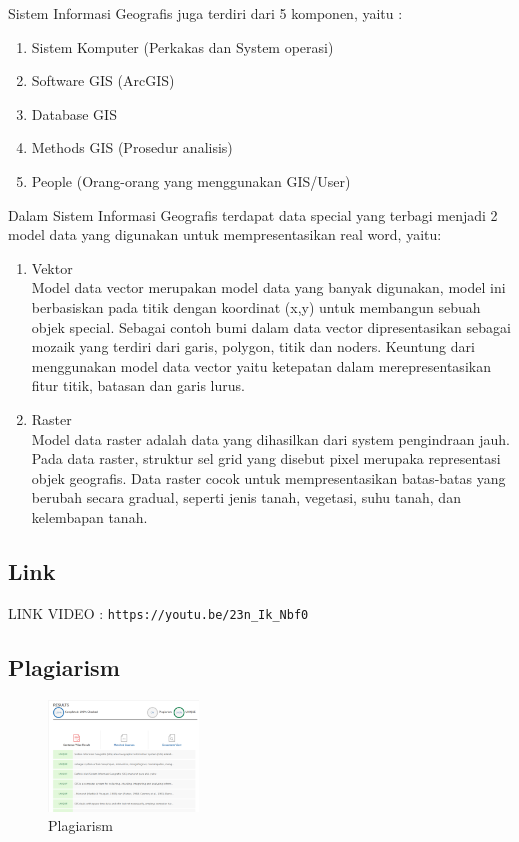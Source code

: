     \par Sistem Informasi Geografis juga terdiri dari 5 komponen, yaitu :
    \begin{enumerate}
        \item Sistem Komputer (Perkakas dan System operasi)
        \item Software GIS (ArcGIS)
        \item Database GIS
        \item Methods GIS (Prosedur analisis)
        \item People (Orang-orang yang menggunakan GIS/User)
    \end{enumerate}
    \par Dalam Sistem Informasi Geografis terdapat data special yang terbagi menjadi 2 model data yang digunakan untuk mempresentasikan real word, yaitu:
    \begin{enumerate}
        \item Vektor\\
        Model data vector merupakan model data yang banyak digunakan, model ini berbasiskan pada titik dengan koordinat (x,y) untuk membangun sebuah objek special. Sebagai contoh bumi dalam data vector dipresentasikan sebagai mozaik yang terdiri dari garis, polygon, titik dan noders. Keuntung dari menggunakan model data vector yaitu ketepatan dalam merepresentasikan fitur titik, batasan dan garis  lurus.
        \item Raster\\
        Model data raster adalah data yang dihasilkan dari system pengindraan jauh. Pada data raster, struktur sel grid yang disebut pixel  merupaka representasi objek geografis. Data raster cocok untuk mempresentasikan batas-batas yang berubah secara gradual, seperti jenis tanah, vegetasi, suhu tanah, dan kelembapan tanah.
    \end{enumerate}
    \subsection{Link}
    LINK VIDEO :  \texttt{https://youtu.be/23n\_Ik\_Nbf0}
    \subsection{Plagiarism}
    \begin{figure}[H]
	\includegraphics[width=4cm]{figures/Tugas1/1174084/plagiarism.png}
	\centering
	\caption{Plagiarism}
    \end{figure}
    

